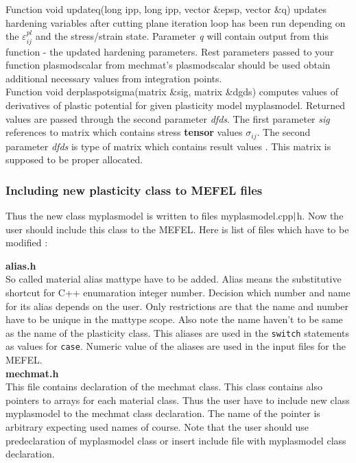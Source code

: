 Function {\sf void updateq(long ipp, long ipp, vector \&epsp, vector \&q)} 
updates hardening variables after cutting plane iteration loop has been run depending on the $\varepsilon^{pl}_{ij}$ and 
the stress/strain state. Parameter {\it q} will contain output from this function - the updated hardening parameters.
Rest parameters passed to your function {\sf plasmodscalar} from mechmat's {\sf plasmodscalar} should be used obtain 
additional necessary values from integration points.
\\

Function {\sf void derplaspotsigma(matrix \&sig, matrix \&dgds)} computes values of derivatives of plastic
potential  for given plasticity model {\sf myplasmodel}. Returned values are passed
through the second parameter {\it dfds}. The first parameter {\it sig} references to matrix which contains
stress {\bf tensor} values $\sigma_{ij}$. The second parameter {\it dfds} is type of matrix which contains
result values . This matrix is supposed to be proper allocated.\\

\subsubsection {Including new plasticity class to MEFEL files}
Thus the new class {\sf myplasmodel} is written to files  myplasmodel.cpp${\rm |}$h. Now the user should
include this class to the MEFEL. Here is list of files which have to be modified :

{\bf alias.h}\\
So called material alias {\sf mattype} have to be added. Alias means the substitutive shortcut
for C++ enumaration integer number. Decision which number and name for its alias depends on the user.
Only restrictions are that the name and number have to be unique in the {\sf mattype} scope. Also note
the name haven't to be same as the name of the plasticity class. This aliases are used in the
{\tt switch} statements as values for {\tt case}. Numeric value of the aliases are used in the input
files for the MEFEL.\\

{\bf mechmat.h}\\
This file contains declaration of the {\sf mechmat} class. This class contains also pointers to arrays for each
material class. Thus the user have to include new class {\sf myplasmodel} to the {\sf mechmat} class declaration.
The name of the pointer is arbitrary expecting used names of course. Note that the user should use predeclaration
of {\sf myplasmodel} class or insert include file with {\sf myplasmodel} class declaration.\\


